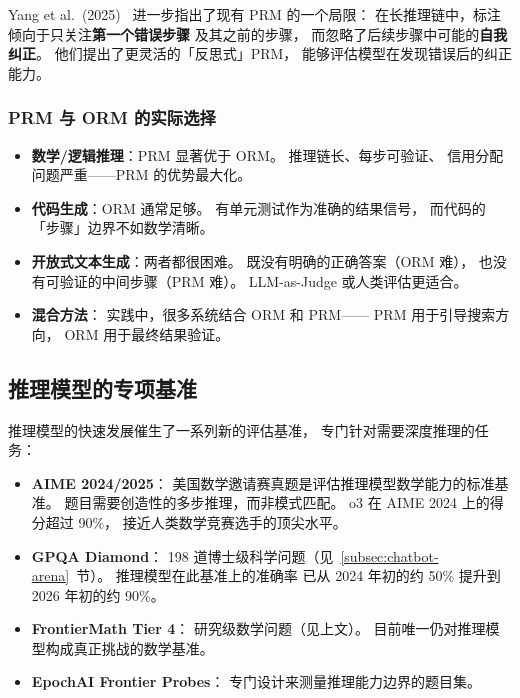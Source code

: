 Yang et al.\ (2025)~\cite{yang2025beyond}
进一步指出了现有 PRM 的一个局限：
在长推理链中，标注倾向于只关注\textbf{第一个错误步骤}
及其之前的步骤，
而忽略了后续步骤中可能的\textbf{自我纠正}。
他们提出了更灵活的「反思式」PRM，
能够评估模型在发现错误后的纠正能力。

\subsubsection{PRM 与 ORM 的实际选择}

\begin{keybox}
\begin{itemize}[noitemsep]
  \item \textbf{数学/逻辑推理}：PRM 显著优于 ORM。
        推理链长、每步可验证、
        信用分配问题严重——PRM 的优势最大化。
  \item \textbf{代码生成}：ORM 通常足够。
        有单元测试作为准确的结果信号，
        而代码的「步骤」边界不如数学清晰。
  \item \textbf{开放式文本生成}：两者都很困难。
        既没有明确的正确答案（ORM 难），
        也没有可验证的中间步骤（PRM 难）。
        LLM-as-Judge 或人类评估更适合。
  \item \textbf{混合方法}：
        实践中，很多系统结合 ORM 和 PRM——
        PRM 用于引导搜索方向，
        ORM 用于最终结果验证。
\end{itemize}
\end{keybox}

\subsection{推理模型的专项基准}
\label{subsec:reasoning-benchmarks}

推理模型的快速发展催生了一系列新的评估基准，
专门针对需要深度推理的任务：

\begin{itemize}[noitemsep]
  \item \textbf{AIME 2024/2025}：
        美国数学邀请赛真题是评估推理模型数学能力的标准基准。
        题目需要创造性的多步推理，而非模式匹配。
        o3 在 AIME 2024 上的得分超过 90\%，
        接近人类数学竞赛选手的顶尖水平。
  \item \textbf{GPQA Diamond}：
        198 道博士级科学问题（见~\ref{subsec:chatbot-arena}~节）。
        推理模型在此基准上的准确率
        已从 2024 年初的约 50\% 提升到 2026 年初的约 90\%。
  \item \textbf{FrontierMath Tier 4}：
        研究级数学问题（见上文）。
        目前唯一仍对推理模型构成真正挑战的数学基准。
  \item \textbf{EpochAI Frontier Probes}：
        专门设计来测量推理能力边界的题目集。
\end{itemize}

